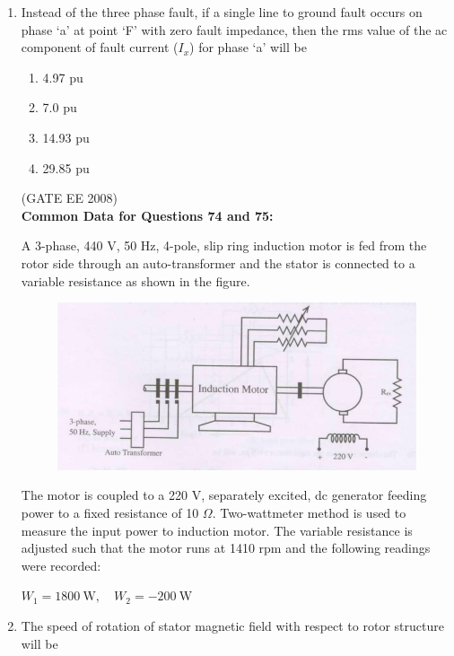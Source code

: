 \documentclass[journal,12pt,onecolumn]{IEEEtran}
\theoremstyle{remark}
\begin{document}
\begin{enumerate}[start=1, label=Q.\arabic*]
\item Instead of the three phase fault, if a single line to ground fault occurs on phase `a' at point `F' with zero fault impedance, then the rms value of the ac component of fault current ($I_x$) for phase `a' will be
\begin{multicols}{4}
\begin{enumerate}
    \item 4.97 pu
    \item 7.0 pu
    \item 14.93 pu
    \item 29.85 pu
\end{enumerate}
\end{multicols}
\hfill (GATE EE 2008) \\[5mm]



\textbf{Common Data for Questions 74 and 75:}

A 3-phase, 440 V, 50 Hz, 4-pole, slip ring induction motor is fed from the rotor side through an auto-transformer and the stator is connected to a variable resistance as shown in the figure.

\begin{figure}[H]
    \centering
    \includegraphics[width=\columnwidth]{Fig/comp2.png}
    \caption{}
    
\end{figure}


The motor is coupled to a 220 V, separately excited, dc generator feeding power to a fixed resistance of 10 $\Omega$. Two-wattmeter method is used to measure the input power to induction motor. The variable resistance is adjusted such that the motor runs at 1410 rpm and the following readings were recorded:  


$W_1 = 1800~\text{W}, \quad W_2 = -200~\text{W}$  \\[5mm]


\item The speed of rotation of stator magnetic field with respect to rotor structure will be


\end{enumerate}
\end{document}
